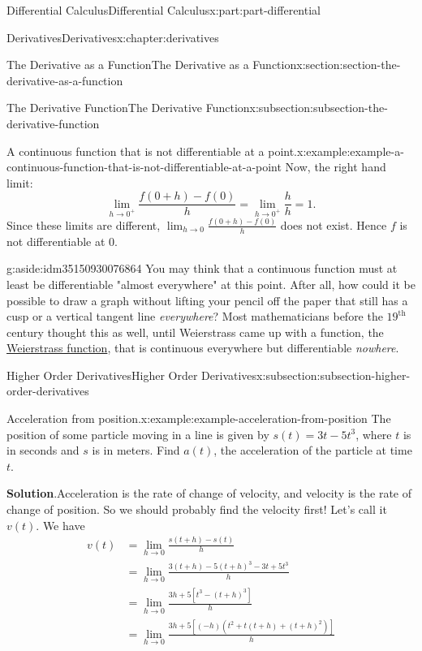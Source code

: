 \documentclass[twoside,10pt,]{tufte-book}
\newcommand{\blocktitlefont}{\relax}
\numberwithin{equation}{part}
\begin{document}
\begin{partptx}{Differential Calculus}{}{Differential Calculus}{}{}{x:part:part-differential}
\begin{chapterptx}{Derivatives}{}{Derivatives}{}{}{x:chapter:derivatives}
\begin{sectionptx}{The Derivative as a Function}{}{The Derivative as a Function}{}{}{x:section:section-the-derivative-as-a-function}
\begin{subsectionptx}{The Derivative Function}{}{The Derivative Function}{}{}{x:subsection:subsection-the-derivative-function}
\begin{example}{A continuous function that is not differentiable at a point.}{x:example:example-a-continuous-function-that-is-not-differentiable-at-a-point}
Now, the right hand limit:%
\begin{equation*}
\lim_{h\to0^{+}}\frac{f(0+h)-f(0)}{h} = \lim_{h\to0^{+}}\frac{h}{h} = 1.
\end{equation*}
Since these limits are different, \(\lim_{h\to0}\frac{f(0+h)-f(0)}{h}\) does not exist. Hence \(f\) is not differentiable at \(0\).%
\end{example}
\begin{aside}{}{g:aside:idm35150930076864}%
You may think that a continuous function must at least be differentiable "almost everywhere" at this point. After all, how could it be possible to draw a graph without lifting your pencil off the paper that still has a cusp or a vertical tangent line \emph{everywhere}? Most mathematicians before the \(19^{\text{th}}\) century thought this as well, until Weierstrass came up with a function, the \href{https://en.wikipedia.org/wiki/Weierstrass_function}{Weierstrass function}\footnotemark{}, that is continuous everywhere but differentiable \emph{nowhere}.%
\end{aside}
%
\end{subsectionptx}
%
%
\typeout{************************************************}
\typeout{************************************************}
%
\begin{subsectionptx}{Higher Order Derivatives}{}{Higher Order Derivatives}{}{}{x:subsection:subsection-higher-order-derivatives}
\begin{example}{Acceleration from position.}{x:example:example-acceleration-from-position}%
The position of some particle moving in a line is given by \(s(t) = 3t-5t^{3}\), where \(t\) is in seconds and \(s\) is in meters. Find \(a(t)\), the acceleration of the particle at time \(t\).%
\par\smallskip%
\noindent\textbf{\blocktitlefont Solution}.\hypertarget{g:solution:idm35150930070336}{}\quad{}Acceleration is the rate of change of velocity, and velocity is the rate of change of position. So we should probably find the velocity first! Let's call it \(v(t)\). We have%
\begin{align*}
v(t) & = \lim_{h\to0}\frac{s(t+h) - s(t)}{h} \\
& = \lim_{h\to0}\frac{3(t+h) - 5(t+h)^{3} - 3t + 5t^{3}}{h} \\
& = \lim_{h\to0}\frac{3h + 5[t^{3} - (t+h)^{3}]}{h} \\
& = \lim_{h\to0}\frac{3h + 5[(-h)(t^{2} + t(t+h) + (t+h)^{2})]}{h} \\

\end{align*}
\end{example}
\end{subsectionptx}
\end{sectionptx}
\end{chapterptx}
\end{partptx}
\end{document}
